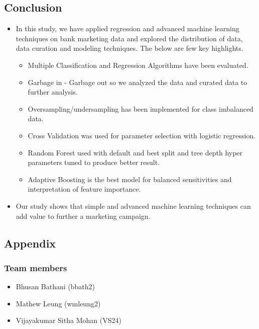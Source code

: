 \documentclass[
]{article}
\providecommand{\tightlist}{%
  \setlength{\itemsep}{0pt}\setlength{\parskip}{0pt}}
\begin{document}
\hypertarget{conclusion}{%
\subsection{Conclusion}\label{conclusion}}

\begin{itemize}
\item
  In this study, we have applied regression and advanced machine
  learning techniques on bank marketing data and explored the
  distribution of data, data curation and modeling techniques. The below
  are few key highlights.

  \begin{itemize}
  \tightlist
  \item
    Multiple Classification and Regression Algorithms have been
    evaluated.
  \item
    Garbage in - Garbage out so we analyzed the data and curated data to
    further analysis.
  \item
    Oversampling/undersampling has been implemented for class imbalanced
    data.
  \item
    Cross Validation was used for parameter selection with logistic
    regression.
  \item
    Random Forest used with default and best split and tree depth hyper
    parameters tuned to produce better result.
  \item
    Adaptive Boosting is the best model for balanced sensitivities and
    interpretation of feature importance.
  \end{itemize}
\item
  Our study shows that simple and advanced machine learning techniques
  can add value to further a marketing campaign.
\end{itemize}

\hypertarget{appendix}{%
\subsection{Appendix}\label{appendix}}

\hypertarget{team-members}{%
\subsubsection{Team members}\label{team-members}}

\begin{itemize}
\tightlist
\item
  Bhusan Bathani (bbath2)
\item
  Mathew Leung (wmleung2)
\item
  Vijayakumar Sitha Mohan (VS24)
\end{itemize}
\end{document}
